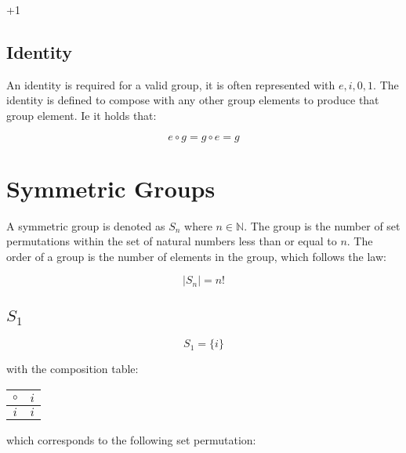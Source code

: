 \documentclass{article}
\newcommand*{\blackboard}[1]{\mathbb{#1}}%
\begin{document}
\centerline{\LARGE +1}
\vspace{5mm}


\subsection{Identity}

An identity is required for a valid group, it is often represented with \( e, i, 0, 1 \). The identity is defined to compose with any other group elements to produce that group element. Ie it holds that:

\[ e \circ g = g \circ e = g \]

\section{Symmetric Groups}

A symmetric group is denoted as \(S_{n}\) where \(n \in \blackboard{N}\). The group is the number of set permutations within the set of natural numbers less than or equal to $n$. The order of a group is the number of elements in the group, which follows the law:

\[|S_{n}| = n!\]

\subsection{$S_{1}$}

\[ S_{1} = \{i\} \]

with the composition table:

\begin{center}
\begin{tabular}{ |c|c| } 
 \hline
 $\circ$ & $i$ \\
 \hline
 $i$ & $i$ \\
 \hline
\end{tabular}
\end{center}

which corresponds to the following set permutation:

\begin{center}
 \centering
\end{center}
\end{document}
